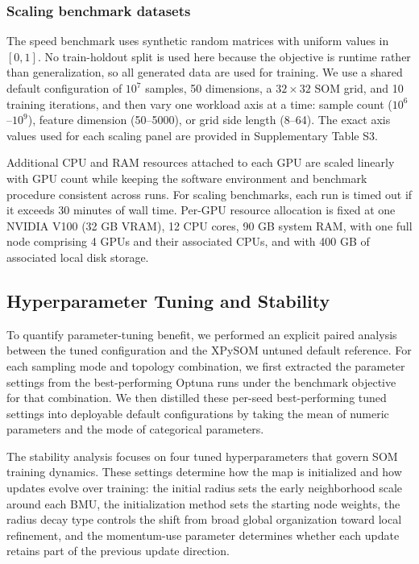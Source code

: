 \documentclass[10pt]{article} %
\begin{document}
\subsubsection{Scaling benchmark datasets}

The speed benchmark uses synthetic random matrices with uniform values in $[0,1]$. No train-holdout split is used here because the objective is runtime rather than generalization, so all generated data are used for training. We use a shared default configuration of $10^7$ samples, 50 dimensions, a $32 \times 32$ SOM grid, and 10 training iterations, and then vary one workload axis at a time: sample count ($10^6$--$10^9$), feature dimension (50--5000), or grid side length (8--64). The exact axis values used for each scaling panel are provided in Supplementary Table S3.

Additional CPU and RAM resources attached to each GPU are scaled linearly with GPU count while keeping the software environment and benchmark procedure consistent across runs. For scaling benchmarks, each run is timed out if it exceeds 30 minutes of wall time. Per-GPU resource allocation is fixed at one NVIDIA V100 (32 GB VRAM), 12 CPU cores, 90 GB system RAM, with one full node comprising 4 GPUs and their associated CPUs, and with 400 GB of associated local disk storage.

\subsection{Hyperparameter Tuning and Stability}

To quantify parameter-tuning benefit, we performed an explicit paired analysis between the tuned configuration and the XPySOM untuned default reference. For each sampling mode and topology combination, we first extracted the parameter settings from the best-performing Optuna runs under the benchmark objective for that combination. We then distilled these per-seed best-performing tuned settings into deployable default configurations by taking the mean of numeric parameters and the mode of categorical parameters.

The stability analysis focuses on four tuned hyperparameters that govern SOM training dynamics. These settings determine how the map is initialized and how updates evolve over training: the initial radius sets the early neighborhood scale around each BMU, the initialization method sets the starting node weights, the radius decay type controls the shift from broad global organization toward local refinement, and the momentum-use parameter determines whether each update retains part of the previous update direction.
\end{document}
